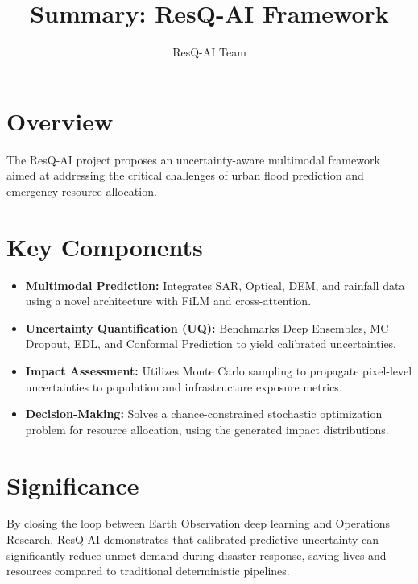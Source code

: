 \documentclass[11pt]{article}
\begin{document}
\title{Summary: ResQ-AI Framework}
\author{ResQ-AI Team}
\date{}
\maketitle

\section*{Overview}
The ResQ-AI project proposes an uncertainty-aware multimodal framework aimed at addressing the critical challenges of urban flood prediction and emergency resource allocation. 

\section*{Key Components}
\begin{itemize}
    \item \textbf{Multimodal Prediction:} Integrates SAR, Optical, DEM, and rainfall data using a novel architecture with FiLM and cross-attention.
    \item \textbf{Uncertainty Quantification (UQ):} Benchmarks Deep Ensembles, MC Dropout, EDL, and Conformal Prediction to yield calibrated uncertainties.
    \item \textbf{Impact Assessment:} Utilizes Monte Carlo sampling to propagate pixel-level uncertainties to population and infrastructure exposure metrics.
    \item \textbf{Decision-Making:} Solves a chance-constrained stochastic optimization problem for resource allocation, using the generated impact distributions.
\end{itemize}

\section*{Significance}
By closing the loop between Earth Observation deep learning and Operations Research, ResQ-AI demonstrates that calibrated predictive uncertainty can significantly reduce unmet demand during disaster response, saving lives and resources compared to traditional deterministic pipelines.
\end{document}
